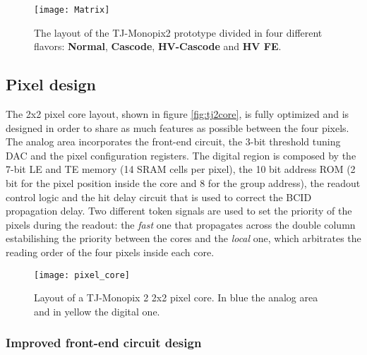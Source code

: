 \begin{figure}[h!]
\centering
\texttt{[image: Matrix]}
\caption{The layout of the TJ-Monopix2 prototype divided in four different flavors: \textbf{Normal}, \textbf{Cascode}, \textbf{HV-Cascode} and \textbf{HV FE}.}
\label{fig:tj2matrix}
\end{figure}



\subsection{Pixel design}

The 2x2 pixel core layout, shown in figure \vref{fig:tj2core}, is fully optimized and is designed in order to share as much features as possible between the four pixels. The analog area incorporates the front-end circuit, the 3-bit threshold tuning DAC and the pixel configuration registers. The digital region is composed by the 7-bit LE and TE memory (14 SRAM cells per pixel), the 10 bit address ROM (2 bit for the pixel position inside the core and 8 for the group address), the readout control logic and the hit delay circuit that is used to correct the BCID propagation delay. Two different token signals are used to set the priority of the pixels during the readout: the \textit{fast} one that propagates across the double column estabilishing the priority between the cores and the \textit{local} one, which arbitrates the reading order of the four pixels inside each core.

\begin{figure}[h!]
\centering
\texttt{[image: pixel\_core]}
\caption{Layout of a TJ-Monopix 2 2x2 pixel core. In blue the analog area and in yellow the digital one.}
\label{fig:tj2core}
\end{figure}



\subsubsection{Improved front-end circuit design}\label{improved_circuit}


